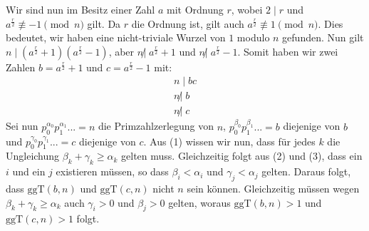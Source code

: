 Wir sind nun im Besitz einer Zahl $a$ mit Ordnung $r$, wobei $2 \mid r$ und $a^\frac{r}{2} \not\equiv -1 \pmod{n}$ gilt. Da $r$ die Ordnung ist, gilt auch $a^\frac{r}{2} \not\equiv 1 \pmod{n}$. Dies bedeutet, wir haben eine nicht-triviale Wurzel von $1$ modulo $n$ gefunden. Nun gilt $n \mid (a^\frac{r}{2} + 1)(a^\frac{r}{2} - 1)$, aber $n \not| \; a^\frac{r}{2} + 1$ und $n \not| \; a^\frac{r}{2} - 1$. Somit haben wir zwei Zahlen $b = a^\frac{r}{2} + 1$ und $c = a^\frac{r}{2} - 1$ mit:
\begin{align}
    n \mid bc \label{eq:1} \\
    n \not| \; b \label{eq:2} \\
    n \not| \; c \label{eq:3}
\end{align}    
Sei nun $p_0^{\alpha_0}p_1^{\alpha_1}... = n$ die Primzahlzerlegung von $n$, $p_0^{\beta_0}p_1^{\beta_1}... = b$ diejenige von $b$ und $p_0^{\gamma_0}p_1^{\gamma_1}... = c$ diejenige von $c$. Aus (1) wissen wir nun, dass für jedes $k$ die Ungleichung $\beta_k + \gamma_k \geq \alpha_k$ gelten muss. Gleichzeitig folgt aus (2) und (3), dass ein $i$ und ein $j$ existieren müssen, so dass $\beta_i < \alpha_i$ und $\gamma_j < \alpha_j$ gelten. Daraus folgt, dass $\text{ggT}(b, n)$ und $\text{ggT}(c, n)$ nicht $n$ sein können. Gleichzeitig müssen wegen $\beta_k + \gamma_k \geq \alpha_k$ auch $\gamma_i > 0$ und $\beta_j > 0$ gelten, woraus $\text{ggT}(b, n) > 1$ und $\text{ggT}(c, n) > 1$ folgt.
